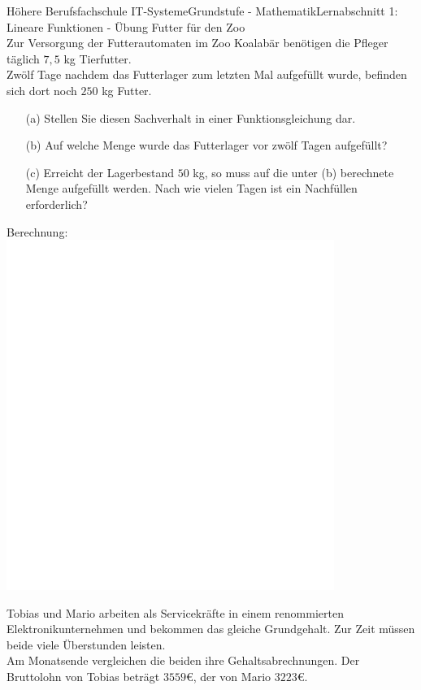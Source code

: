 \documentclass[oneside,openany,headings=optiontotoc,11pt,numbers=noenddot]{scrreprt}
\begin{document}
\begin{worksheet}{Höhere Berufsfachschule IT-Systeme}{Grundstufe - Mathematik}{Lernabschnitt 1: Lineare Funktionen - Übung}
		\setcounter{page}{1}
		\noindent
		\LARGE Futter für den Zoo\\
		\normalsize
		\noindent
		Zur Versorgung der Futterautomaten im Zoo \grqq{}Koalabär\grqq{} benötigen die Pfleger täglich \(7,5\) kg Tierfutter.\\
		Zwölf Tage nachdem das Futterlager zum letzten Mal aufgefüllt wurde, befinden sich dort noch \(250\) kg Futter.
		\begin{itemize}
			\item[(a)] Stellen Sie diesen Sachverhalt in einer Funktionsgleichung dar.
			\item[(b)] Auf welche Menge wurde das Futterlager vor zwölf Tagen aufgefüllt?
			\item[(c)] Erreicht der Lagerbestand \(50\) kg, so muss auf die unter (b) berechnete Menge aufgefüllt werden. Nach wie vielen Tagen ist ein Nachfüllen erforderlich?
		\end{itemize}
		\begin{framed}
			\noindent
			\small{\color{codegray}Berechnung:}\\
			\includegraphics[width=0.8\textwidth]{../../empty.jpg}\\
		\end{framed}
		\normalsize
		\newpage
		\noindent
		Tobias und Mario arbeiten als Servicekräfte in einem renommierten Elektronikunternehmen und bekommen das gleiche Grundgehalt. Zur Zeit müssen beide viele Überstunden leisten.\\
		Am Monatsende vergleichen die beiden ihre Gehaltsabrechnungen. Der Bruttolohn von Tobias beträgt \(3559\)\euro{}, der von Mario \(3223\)\euro{}.\\

\end{worksheet}
\end{document}
